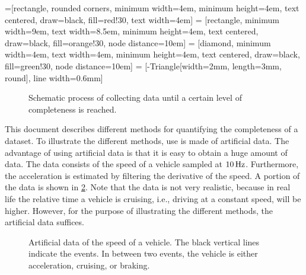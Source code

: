 \documentclass[10pt,final,a4paper,oneside,onecolumn]{article}
\newlength\figurewidth
\newlength\figureheight
\theoremstyle{plain}\newtheorem{definition}{Definition}[section]    %
\theoremstyle{definition}\newtheorem{example}{Example}[section]     %
\theoremstyle{remark}\newtheorem{remarkenv}{Remark}[section]        %
\begin{document}
=[rectangle, rounded corners, minimum width=4em, minimum height=4em, text centered, draw=black, fill=red!30, text width=4em]
 = [rectangle, minimum width=9em, text width=8.5em, minimum height=4em, text centered, draw=black, fill=orange!30, node distance=10em]
 = [diamond, minimum width=4em, text width=4em, minimum height=4em, text centered, draw=black, fill=green!30, node distance=10em]
 = [-{Triangle[width=2mm, length=3mm, round]}, line width=0.6mm] %
\begin{figure}[b]
	\centering
	\caption{Schematic process of collecting data until a certain level of completeness is reached.}
	\label{fig:completeness collection}
\end{figure}

This document describes different methods for quantifying the completeness of a dataset. To illustrate the different methods, use is made of artificial data. The advantage of using artificial data is that it is easy to obtain a huge amount of data. The data consists of the speed of a vehicle sampled at $\unit[10]{Hz}$. Furthermore, the acceleration is estimated by filtering the derivative of the speed. A portion of the data is shown in \cref{fig:artificial data}. Note that the data is not very realistic, because in real life the relative time a vehicle is cruising, i.e., driving at a constant speed, will be higher. However, for the purpose of illustrating the different methods, the artificial data suffices.

\setlength{}              %
\setlength{}              %
\begin{figure}[b]
	\centering
	
	\caption{Artificial data of the speed of a vehicle. The black vertical lines indicate the events. In between two events, the vehicle is either acceleration, cruising, or braking.}
	\label{fig:artificial data}
\end{figure}
\end{document}
